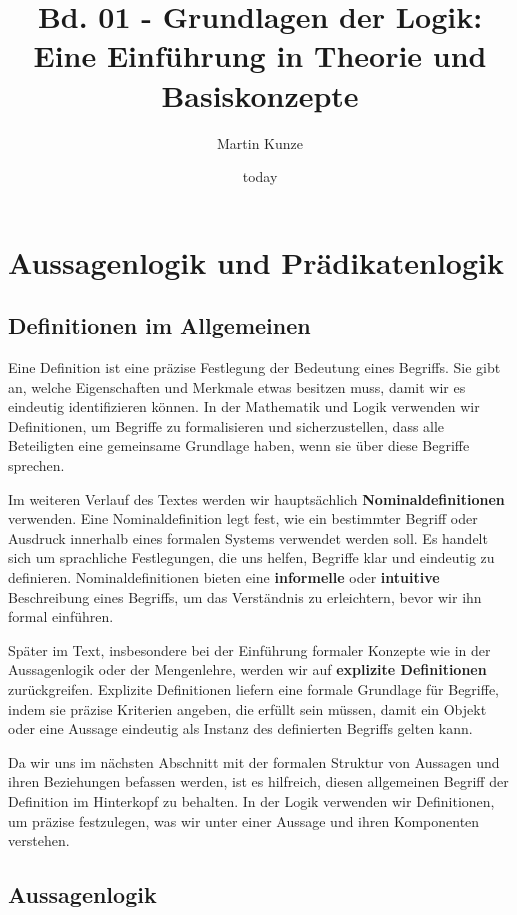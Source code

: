 \documentclass[main.tex]{subfiles}
\title{Bd. 01 - Grundlagen der Logik: Eine Einführung in Theorie und Basiskonzepte}
\author{Martin Kunze}
\date{today}
\begin{document}
\maketitle
\tableofcontents
\raggedbottom

\chapter{Aussagenlogik und Prädikatenlogik}

\section{Definitionen im Allgemeinen}

Eine Definition ist eine präzise Festlegung der Bedeutung eines Begriffs. Sie gibt an, welche Eigenschaften und Merkmale etwas besitzen muss, damit wir es eindeutig identifizieren können. In der Mathematik und Logik verwenden wir Definitionen, um Begriffe zu formalisieren und sicherzustellen, dass alle Beteiligten eine gemeinsame Grundlage haben, wenn sie über diese Begriffe sprechen.

Im weiteren Verlauf des Textes werden wir hauptsächlich \textbf{Nominaldefinitionen} verwenden. Eine Nominaldefinition legt fest, wie ein bestimmter Begriff oder Ausdruck innerhalb eines formalen Systems verwendet werden soll. Es handelt sich um sprachliche Festlegungen, die uns helfen, Begriffe klar und eindeutig zu definieren. Nominaldefinitionen bieten eine \textbf{informelle} oder \textbf{intuitive} Beschreibung eines Begriffs, um das Verständnis zu erleichtern, bevor wir ihn formal einführen.

Später im Text, insbesondere bei der Einführung formaler Konzepte wie in der Aussagenlogik oder der Mengenlehre, werden wir auf \textbf{explizite Definitionen} zurückgreifen. Explizite Definitionen liefern eine formale Grundlage für Begriffe, indem sie präzise Kriterien angeben, die erfüllt sein müssen, damit ein Objekt oder eine Aussage eindeutig als Instanz des definierten Begriffs gelten kann.

Da wir uns im nächsten Abschnitt mit der formalen Struktur von Aussagen und ihren Beziehungen befassen werden, ist es hilfreich, diesen allgemeinen Begriff der Definition im Hinterkopf zu behalten. In der Logik verwenden wir Definitionen, um präzise festzulegen, was wir unter einer Aussage und ihren Komponenten verstehen.

\section{Aussagenlogik}
\end{document}
